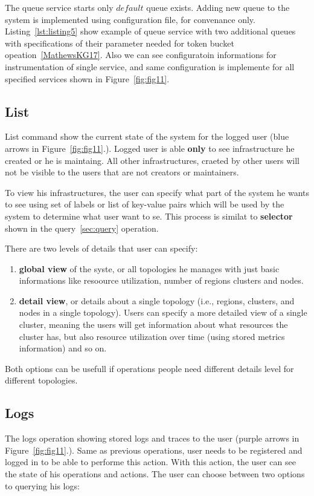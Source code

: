  The queue service starts only $default$ queue exists. Adding new queue to the system is implemented using configuration file, for convenance only. Listing~\ref{lst:listing5} show example of queue service with two additional queues with specifications of their parameter needed for token bucket opeation~\ref{MathewsKG17}. Also we can see configuratoin informations for instrumentation of single service, and same configuration is implemente for all specified services shown in Figure~\ref{fig:fig11}.


%
%
\subsection{List}\label{sec:list}  
List command show the current state of the system for the logged user (blue arrows in Figure~\ref{fig:fig11}.). Logged user is able \textbf{only} to see infrastructure he created or he is maintaing. All other infrastructures, craeted by other users will not be visible to the users that are not creators or maintainers.

To view his infrastructures, the user can specify what part of the system he wants to see using set of labels or list of key-value pairs which will be used by the system to determine what user want to se. This process is similat to \textbf{selector} shown in the query~\ref{sec:query} operation. 

There are two levels of details that user can specify:

\begin{enumerate}[start=1,label={(\bfseries \arabic*)}]
	\item \textbf{global view}  of the syste, or all topologies he manages with just basic informations like resoource utilization, number of regions clusters and nodes.
	\item \textbf{detail view}, or details about a single topology (i.e., regions, clusters, and nodes in a single topology). Users can specify a more detailed view of a single cluster, meaning the users will get information about what resources the cluster has, but also resource utilization over time (using stored metrics information) and so on.
\end{enumerate}

Both options can be usefull if operations people need different details level for different topologies. 
%
%
\subsection{Logs}\label{sec:logs}
% 
The logs operation showing stored logs and traces to the user (purple arrows in Figure~\ref{fig:fig11}.). Same as previous operations, user needs to be registered and logged in to be able to performe this action. With this action, the user can see the state of his operations and actions. The user can choose between two options to querying his logs:

